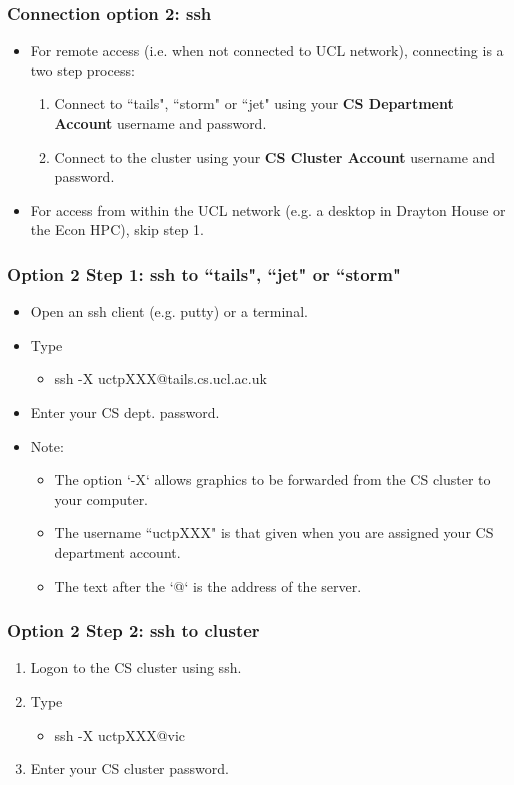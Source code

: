 \documentclass{beamer}
\begin{document}
\begin{frame}
\frametitle{Connection option 2: ssh}
\begin{itemize}
\item For remote access (i.e. when not connected to UCL network), connecting is a two step process:
\begin{enumerate}
\item Connect to ``tails", ``storm" or ``jet" using your \textbf{CS Department Account} username and password.
\item Connect to the cluster using your \textbf{CS Cluster Account} username and password.
\end{enumerate}
\item For access from within the UCL network (e.g. a desktop in Drayton House or the Econ HPC), skip step 1.
\end{itemize}
\end{frame}

\begin{frame}
\frametitle{Option 2 Step 1: ssh to ``tails", ``jet" or ``storm"}
\begin{itemize}
\item Open an ssh client (e.g. putty) or a terminal.
\item Type
\begin{itemize}
\item ssh -X uctpXXX@tails.cs.ucl.ac.uk
\end{itemize} 
\item Enter your CS dept. password.
\item Note:
\begin{itemize}
\item The option `-X` allows graphics to be forwarded from the CS cluster to your computer.
\item The username ``uctpXXX" is that given when you are assigned your CS department account.
\item The text after the `@` is the address of the server.
\end{itemize}
\end{itemize}
\end{frame}

\begin{frame}
\frametitle{Option 2 Step 2: ssh to cluster}
\begin{enumerate}
\item Logon to the CS cluster using ssh.
\item Type 
\begin{itemize}
\item ssh -X uctpXXX@vic
\end{itemize}
\item Enter your CS cluster password.
\end{enumerate}
\end{frame}
\end{document}
